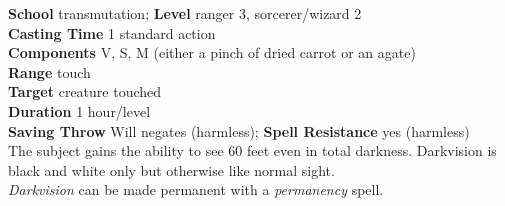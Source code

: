 \textbf{School} transmutation; \textbf{Level} ranger 3, sorcerer/wizard 2\\
\textbf{Casting Time} 1 standard action\\
\textbf{Components} V, S, M (either a pinch of dried carrot or an agate)\\
\textbf{Range} touch\\
\textbf{Target} creature touched\\
\textbf{Duration} 1 hour/level\\
\textbf{Saving Throw }Will negates (harmless); \textbf{Spell Resistance} yes (harmless)\\
The subject gains the ability to see 60 feet even in total darkness. Darkvision is black and white only but otherwise like normal sight.\\
\textit{Darkvision }can be made permanent with a \textit{permanency }spell.\\

